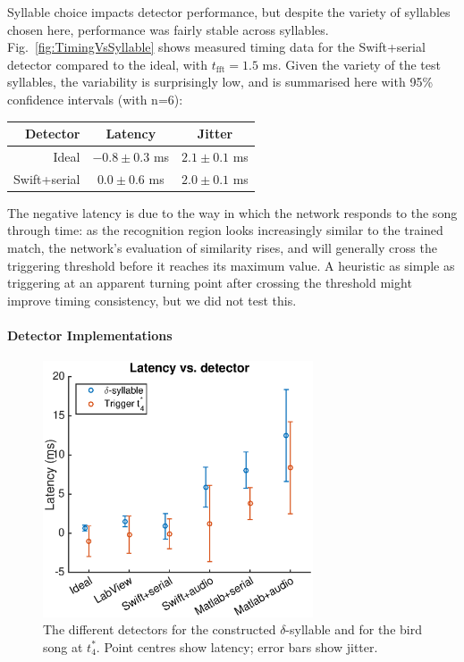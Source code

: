 \documentclass[10pt,letterpaper]{article}
\newcommand\fig[1]{Fig.~\ref{#1}}
\renewcommand{\subsubsection}[1]{\paragraph{#1}}
\begin{document}
Syllable choice impacts detector performance, but despite the variety of syllables chosen here, performance was fairly stable across syllables.  \fig{fig:TimingVsSyllable} shows measured timing data for the Swift+serial detector compared to the ideal, with $t_{\textrm{fft}}=1.5$ ms.  Given the variety of the test syllables, the variability is surprisingly low, and is summarised here with 95\% confidence intervals (with n=6):
\vspace{8pt}\par\noindent
\begin{tabular}{r|cc}
  Detector & Latency & Jitter \\ 
  \hline   Ideal & $-0.8\pm 0.3$ ms & $2.1\pm 0.1$ ms \\
  Swift+serial & $0.0\pm 0.6$ ms & $2.0\pm 0.1$ ms
\end{tabular}
\vspace{8pt}\par\noindent
The negative latency is due to the way in which the network responds to the song through time: as the recognition region looks increasingly similar to the trained match, the network's evaluation of similarity rises, and will generally cross the triggering threshold before it reaches its maximum value.  A heuristic as simple as triggering at an apparent turning point after crossing the threshold might improve timing consistency, but we did not test this.

\subsubsection{Detector Implementations}

\begin{figure}
  \begin{center}
    \includegraphics[width=8cm]{TimingVsDetector}
  \end{center}
  \caption{The different detectors for the constructed $\delta$-syllable and for the bird song at $t^*_4$.  Point centres show latency; error bars show jitter.}
  \label{fig:TimingVsDetector}
\end{figure}
\end{document}
